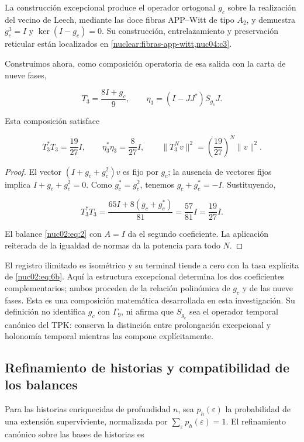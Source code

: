 La construcción excepcional produce el operador ortogonal \(g_c\) sobre la realización del vecino de Leech, mediante las doce fibras APP–Witt de tipo \(A_2\), y demuestra \(g_c^3=I\) y \(\ker(I-g_c)=0\). Su construcción, entrelazamiento y preservación reticular están localizados en \cref{nuclear:fibras-app-witt,nuc04:c3}.

Construimos ahora, como composición operatoria de esa salida con la carta de nueve fases,

\[
T_3=\frac{8I+g_c}{9},\qquad
\eta_3=(I-JJ^*)S_{g_c}J.
\]

\begin{corollary}
Esta composición satisface

\begin{equation}
\boxed{T_3^*T_3=\frac{19}{27}I,\qquad
\eta_3^*\eta_3=\frac8{27}I,\qquad
\|T_3^Nv\|^2=\left(\frac{19}{27}\right)^N\|v\|^2.}\label{nuc02:eq:6b}
\end{equation}
\end{corollary}

\begin{proof}
El vector \((I+g_c+g_c^2)v\) es fijo por \(g_c\); la ausencia de vectores fijos implica \(I+g_c+g_c^2=0\). Como \(g_c^*=g_c^2\), tenemos \(g_c+g_c^*=-I\). Sustituyendo,

\[
T_3^*T_3=\frac{65I+8(g_c+g_c^*)}{81}
=\frac{57}{81}I=\frac{19}{27}I.
\]

El balance \eqref{nuc02:eq:2} con \(A=I\) da el segundo coeficiente. La aplicación reiterada de la igualdad de normas da la potencia para todo \(N\).
\end{proof}

El registro ilimitado es isométrico y su terminal tiende a cero con la tasa explícita de \eqref{nuc02:eq:6b}. Aquí la estructura excepcional determina los dos coeficientes complementarios; ambos proceden de la relación polinómica de \(g_c\) y de las nueve fases. Esta es una composición matemática desarrollada en esta investigación. Su definición no identifica \(g_c\) con \(\Gamma_9\), ni afirma que \(S_{g_c}\) sea el operador temporal canónico del TPK: conserva la distinción entre prolongación excepcional y holonomía temporal mientras las compone explícitamente.

\subsection{Refinamiento de historias y compatibilidad de los balances}

Para las historias enriquecidas de profundidad \(n\), sea \(p_h(\varepsilon)\) la probabilidad de una extensión superviviente, normalizada por \(\sum_\varepsilon p_h(\varepsilon)=1\). El refinamiento canónico sobre las bases de historias es

